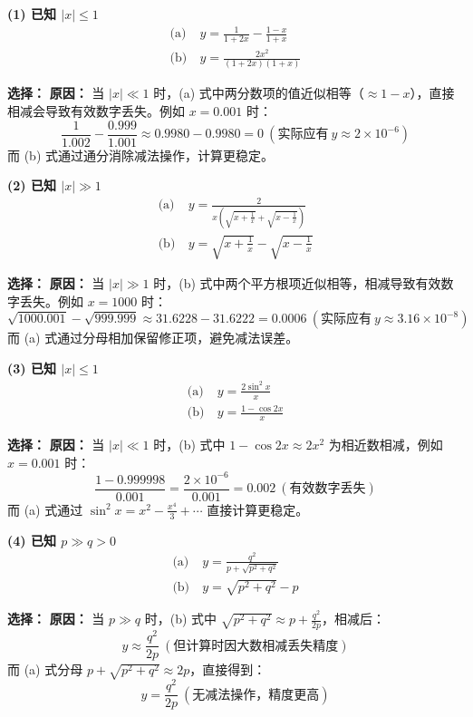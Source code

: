 \documentclass[UTF8]{ctexart}
\begin{document}
\begin{tcolorbox}[colback=green!5!white,colframe=green!75!black,title=10. 数值稳定性公式选择]
	
	\textbf{(1) 已知 $|x| \leq 1$}
	\begin{align*}
	\text{(a)}\ & y = \frac{1}{1+2x} - \frac{1-x}{1+x} \\
	\text{(b)}\ & y = \frac{2x^2}{(1+2x)(1+x)}
	\end{align*}
	
	\textbf{选择：} 
	\textbf{原因：}
	当 $|x| \ll 1$ 时，(a) 式中两分数项的值近似相等（$\approx 1 - x$），直接相减会导致有效数字丢失。例如 $x=0.001$ 时：
	$$
	\frac{1}{1.002} - \frac{0.999}{1.001} \approx 0.9980 - 0.9980 = 0\ (\text{实际应有}\ y \approx 2 \times 10^{-6})
	$$
	而 (b) 式通过通分消除减法操作，计算更稳定。
	
	\textbf{(2) 已知 $|x| \gg 1$}
	\begin{align*}
	\text{(a)}\ & y = \frac{2}{x \left( \sqrt{x + \frac{1}{x}} + \sqrt{x - \frac{1}{x}} \right)} \\
	\text{(b)}\ & y = \sqrt{x + \frac{1}{x}} - \sqrt{x - \frac{1}{x}}
	\end{align*}
	
	\textbf{选择：} 
	\textbf{原因：}
	当 $|x| \gg 1$ 时，(b) 式中两个平方根项近似相等，相减导致有效数字丢失。例如 $x=1000$ 时：
	$$
	\sqrt{1000.001} - \sqrt{999.999} \approx 31.6228 - 31.6222 = 0.0006\ (\text{实际应有}\ y \approx 3.16 \times 10^{-8})
	$$
	而 (a) 式通过分母相加保留修正项，避免减法误差。
	
	\textbf{(3) 已知 $|x| \leq 1$}
	\begin{align*}
	\text{(a)}\ & y = \frac{2\sin^2 x}{x} \\
	\text{(b)}\ & y = \frac{1 - \cos 2x}{x}
	\end{align*}
	
	\textbf{选择：} 
	\textbf{原因：}
	当 $|x| \ll 1$ 时，(b) 式中 $1 - \cos 2x \approx 2x^2$ 为相近数相减，例如 $x=0.001$ 时：
	$$
	\frac{1 - 0.999998}{0.001} = \frac{2 \times 10^{-6}}{0.001} = 0.002\ (\text{有效数字丢失})
	$$
	而 (a) 式通过 $\sin^2 x = x^2 - \frac{x^4}{3} + \cdots$ 直接计算更稳定。
	
	\textbf{(4) 已知 $p \gg q > 0$}
	\begin{align*}
	\text{(a)}\ & y = \frac{q^2}{p + \sqrt{p^2 + q^2}} \\
	\text{(b)}\ & y = \sqrt{p^2 + q^2} - p
	\end{align*}
	
	\textbf{选择：} 
	\textbf{原因：}
	当 $p \gg q$ 时，(b) 式中 $\sqrt{p^2 + q^2} \approx p + \frac{q^2}{2p}$，相减后：
	$$
	y \approx \frac{q^2}{2p}\ (\text{但计算时因大数相减丢失精度})
	$$
	而 (a) 式分母 $p + \sqrt{p^2 + q^2} \approx 2p$，直接得到：
	$$
	y = \frac{q^2}{2p}\ (\text{无减法操作，精度更高})
	$$
	
\end{tcolorbox}
\end{document}

